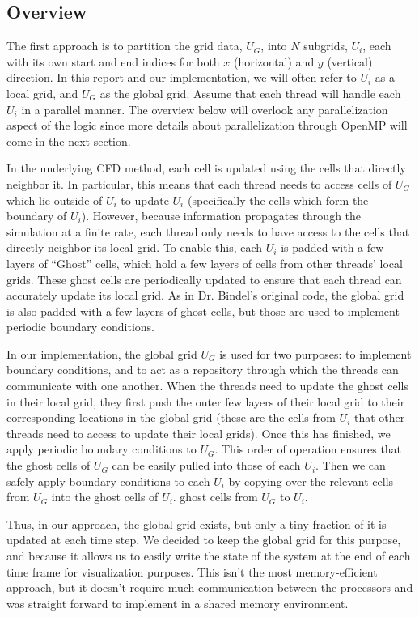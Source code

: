\documentclass{article}
\begin{document}
\subsection{Overview}
The first approach is to partition the grid data, $U_G$, into $N$ subgrids, $U_i$, each with its own start and end indices for both $x$ (horizontal) and $y$ (vertical) direction. In this report and our implementation, we will often refer to $U_i$ as a local grid, and $U_G$ as the global grid. Assume that each thread will handle each $U_i$ in a parallel manner. The overview below will overlook any parallelization aspect of the logic since more details about parallelization through OpenMP will come in the next section.

In the underlying CFD method, each cell is updated using the cells that directly neighbor it. In particular, this means that each thread needs to access cells of $U_G$ which lie outside of $U_i$ to update $U_i$ (specifically the cells which form the boundary of $U_i$). However, because information propagates through the simulation at a finite rate, each thread only needs to have access to the cells that directly neighbor its local grid. To enable this, each $U_i$ is padded with a few layers of ``Ghost'' cells, which hold a few layers of cells from other threads' local grids. These ghost cells are periodically updated to ensure that each thread can accurately update its local grid. As in Dr. Bindel's original code, the global grid is also padded with a few layers of ghost cells, but those are used to implement periodic boundary conditions.

In our implementation, the global grid $U_G$ is used for two purposes: to implement boundary conditions, and to act as a repository through which the threads can communicate with one another. When the threads need to update the ghost cells in their local grid, they first push the outer few layers of their local grid to their corresponding locations in the global grid (these are the cells from $U_i$ that other threads need to access to update their local grids). Once this has finished, we apply periodic boundary conditions to $U_G$. This order of operation ensures that the ghost cells of $U_G$ can be easily pulled into those of each $U_i$. Then we can safely apply boundary conditions to each $U_i$ by copying over the relevant cells from $U_G$ into the ghost cells of $U_i$. ghost cells from $U_G$ to $U_i$.

Thus, in our approach, the global grid exists, but only a tiny fraction of it is updated at each time step.  We decided to keep the global grid for this purpose, and because it allows us to easily write the state of the system at the end of each time frame for visualization purposes. This isn't the most memory-efficient approach, but it doesn't require much communication between the processors and was straight forward to implement in a shared memory environment.
\end{document}
